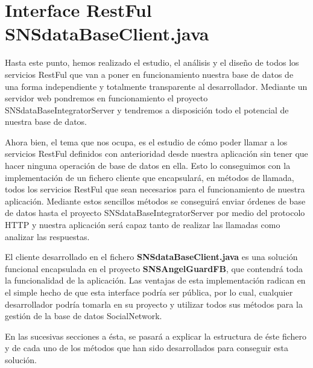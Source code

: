 \section{Interface RestFul SNSdataBaseClient.java}
Hasta este punto, hemos realizado el estudio, el análisis y el diseño de todos los servicios RestFul que van a poner en funcionamiento nuestra base de datos de una forma independiente y totalmente transparente al desarrollador. Mediante un servidor web pondremos en funcionamiento el proyecto SNSdataBaseIntegratorServer y tendremos a disposición todo el potencial de nuestra base de datos.
\bigskip
\par
Ahora bien, el tema que nos ocupa, es el estudio de cómo poder llamar a los servicios RestFul definidos con anterioridad desde nuestra aplicación sin tener que hacer ninguna operación de base de datos en ella. Esto lo conseguimos con la implementación de un fichero cliente que encapsulará, en métodos de llamada, todos los servicios RestFul que sean necesarios para el funcionamiento de nuestra aplicación. Mediante estos sencillos métodos se conseguirá enviar órdenes de base de datos hasta el proyecto SNSdataBaseIntegratorServer por medio del protocolo HTTP y nuestra aplicación será capaz tanto de realizar las llamadas como analizar las respuestas. 
\bigskip
\par
El cliente desarrollado en el fichero \textbf{SNSdataBaseClient.java} es una solución funcional encapsulada en el proyecto \textbf{SNSAngelGuardFB}, que contendrá toda la funcionalidad de la aplicación. Las ventajas de esta implementación radican en el simple hecho de que esta interface podría ser pública, por lo cual, cualquier desarrollador podría tomarla en su proyecto y utilizar todos sus métodos para la gestión de la base de datos SocialNetwork.
\bigskip
\par
En las sucesivas secciones a ésta, se pasará a explicar la estructura de éste fichero y de cada uno de los métodos que han sido desarrollados para conseguir esta solución.

